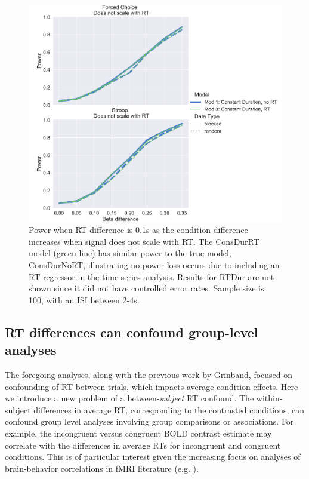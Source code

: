 \documentclass[titlepage,12pt] {article}
\begin{document}
\begin{figure}[h!]
  \centering
   \includegraphics[width=5in]{Figures/power_24_rtdiff_1.pdf}
   \caption{Power when RT difference is 0.1s as the condition difference increases when signal does not scale with RT. The ConsDurRT model (green line) has similar power to the true model, ConsDurNoRT, illustrating no power loss occurs due to including an RT regressor in the time series analysis. Results for RTDur are not shown since it did not have controlled error rates.   Sample size is 100, with an ISI between 2-4s. }
  \label{fig:power_rtdiff}
\end{figure}


\subsection*{RT differences can confound group-level analyses}

The foregoing analyses, along with the previous work by Grinband, focused on confounding of RT between-trials, which impacts average condition effects.  Here we introduce a new problem of a between-\emph{subject} RT confound.  The within-subject differences in average RT, corresponding to the contrasted conditions,  can confound group level analyses involving group comparisons or associations.  For example, the incongruent versus congruent BOLD contrast estimate may correlate with the differences in average RTs for incongruent and congruent conditions.  This is of particular interest given the increasing focus on analyses of brain-behavior correlations in fMRI literature (e.g. \citet{duboisBuildingScienceIndividual2016}).
\end{document}
